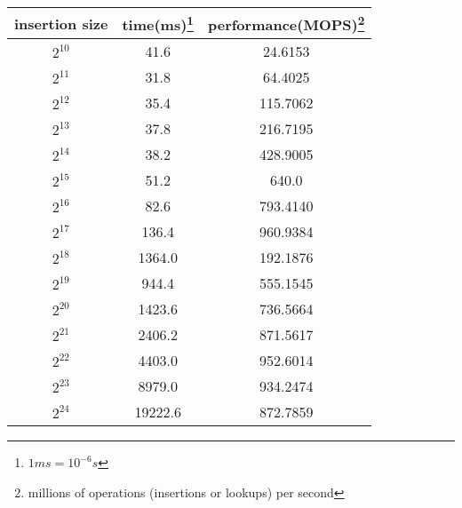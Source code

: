 \documentclass{article}
\begin{document}
\begin{tabular}{|c|c|c|}
	\hline
	insertion size & time(ms)\footnote{$1ms=10^{-6}s$} & performance(MOPS)\footnote{millions of operations (insertions or lookups) per second} \\
	\hline
	$2^{10}$       & 41.6                              & 24.6153                                                                               \\
	$2^{11}$       & 31.8                              & 64.4025                                                                               \\
	$2^{12}$       & 35.4                              & 115.7062                                                                              \\
	$2^{13}$       & 37.8                              & 216.7195                                                                              \\
	$2^{14}$       & 38.2                              & 428.9005                                                                              \\
	$2^{15}$       & 51.2                              & 640.0                                                                                 \\
	$2^{16}$       & 82.6                              & 793.4140                                                                              \\
	$2^{17}$       & 136.4                             & 960.9384                                                                              \\
	$2^{18}$       & 1364.0                            & 192.1876                                                                              \\
	$2^{19}$       & 944.4                             & 555.1545                                                                              \\
	$2^{20}$       & 1423.6                            & 736.5664                                                                              \\
	$2^{21}$       & 2406.2                            & 871.5617                                                                              \\
	$2^{22}$       & 4403.0                            & 952.6014                                                                              \\
	$2^{23}$       & 8979.0                            & 934.2474                                                                              \\
	$2^{24}$       & 19222.6                           & 872.7859                                                                              \\
	\hline
\end{tabular}
\end{document}
